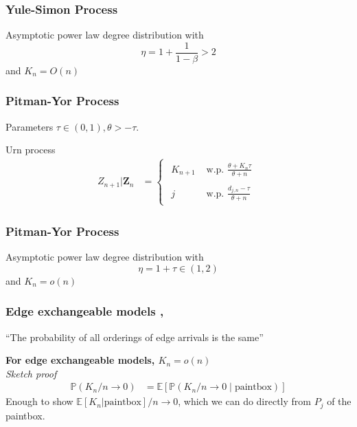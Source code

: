 \documentclass[final,hyperref={pdfpagelabels=false},noamsthm]{beamer}
\def\bbE{\mathbb{E}}
\newcommand{\prob}{\mathbb{P}}
\newcommand{\ee}{Z} %
\newcommand{\bfee}{\mathbf{\ee}}
\begin{document}
\begin{frame}
	\frametitle{Yule-Simon Process}
	Asymptotic power law degree distribution with
	\begin{equation*}
		\eta = 1 + \frac{1}{1-\beta} > 2
	\end{equation*}
	and $K_n = O(n)$
\end{frame}

\begin{frame}
	\frametitle{Pitman-Yor Process}
	Parameters $\tau \in (0, 1), \theta > -\tau$.
	\vspace{15pt}
	
	Urn process
	\begin{align*} 
	\ee_{n+1} | \bfee_{n} &= \begin{cases}\begin{aligned}
	K_{n+1} & \text{ w.p. } \frac{\theta + K_n \tau}{\theta + n}  \\
	& \\
	j &\text{ w.p. } \frac{d_{j,n} - \tau}{\theta + n} 
	\end{aligned}\end{cases}
	\label{eq:pyp2}
	\end{align*}
\end{frame}

\begin{frame}
	\frametitle{Pitman-Yor Process}
	Asymptotic power law degree distribution with
	\begin{equation*}
		\eta = 1 + \tau \in (1, 2)
	\end{equation*}
	and $K_n = o(n)$
\end{frame}


\begin{frame}
	\frametitle{Edge exchangeable models \cite{cai2016}, \cite{CraneDempsey2017}}
	``The probability of all orderings of edge arrivals is the same''
	
	\vspace{20pt}
	
	\textbf{For edge exchangeable models, $K_n = o(n)$} \\
	\textit{Sketch proof}
	\begin{align*}
		\prob (K_n / n \to 0) &= \bbE[\prob(K_n/n \to 0 \mid \text{paintbox})]
	\end{align*}
	Enough to show $\bbE[K_n | \text{paintbox}]/n \to 0$, which we can do directly from $P_j$ of the paintbox.
	
\end{frame}
\end{document}
